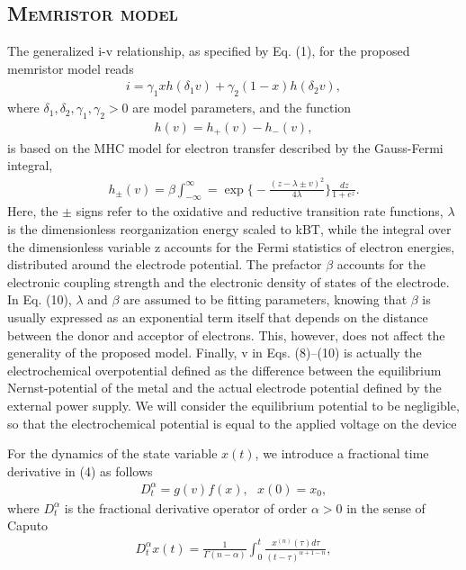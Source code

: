 \documentclass[10pt]{article}
\begin{document}
\begin{multicols}{2}
{\section{\scshape Memristor model}
}
The generalized i-v relationship, as specified by Eq. (1), for the proposed memristor model reads
\begin{align}
    i = \gamma _1 x h(\delta _1 v) + \gamma _2(1 - x) h (\delta _2 v),
\end{align}
where $\delta _1, \delta _2, \gamma _1, \gamma _2 > 0$ are model parameters, and the function
\begin{align}{}
    h (v) = h_+ (v) - h_- (v),
\end{align}
is based on the MHC model for electron transfer described by the Gauss-Fermi integral,
\begin{align}
    h_\pm (v) = \beta \int_{-\infty}^\infty = \exp{\biggl\{ -\frac{(z - \lambda \pm v)^2}{4 \lambda} \biggr\} } \frac{\,dz}{1+e^z}.
\end{align}
Here, the $\pm$ signs refer to the oxidative and reductive
transition rate functions, $\lambda$ is the dimensionless reorganization energy scaled to kBT, while the integral over the
dimensionless variable z accounts for the Fermi statistics of electron energies, distributed around the electrode
potential. The prefactor $\beta$ accounts for the electronic
coupling strength and the electronic density of states of
the electrode. In Eq. (10), $\lambda$ and $\beta$ are assumed to be
fitting parameters, knowing that $\beta$ is usually expressed
as an exponential term itself that depends on the distance between the donor and acceptor of electrons. This,
however, does not affect the generality of the proposed
model. Finally, v in Eqs. (8)–(10) is actually the electrochemical overpotential defined as the difference between
the equilibrium Nernst-potential of the metal and the
actual electrode potential defined by the external power
supply. We will consider the equilibrium potential to be
negligible, so that the electrochemical potential is equal
to the applied voltage on the device \par
For the dynamics of the state variable $x(t)$, we introduce a fractional time derivative in (4) as follows
\begin{align}
    D_t^\alpha = g(v)f(x), ~~~x(0) = x_0,
\end{align}
where $ D_t^\alpha$ is the fractional derivative operator of order
$\alpha > 0$ in the sense of Caputo
\begin{align}
    D_t^\alpha x(t) = \frac{1}{\Gamma (n-\alpha)} \int_0^t \frac{x^{(n)} (\tau)d \tau}{(t - \tau)^{\alpha+1-n}},

\end{align}
\end{multicols}
\end{document}
